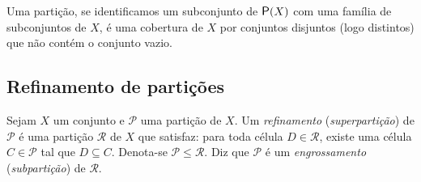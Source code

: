 Uma partição, se identificamos um subconjunto de $\p(X)$ com uma família de subconjuntos de $X$, é uma cobertura de $X$ por conjuntos disjuntos (logo distintos) que não contém o conjunto vazio.

\subsection{Refinamento de partições}

\begin{definition}
Sejam $X$ um conjunto e $\mathcal P$ uma partição de $X$. Um \emph{refinamento} (\emph{superpartição}) de $\mathcal P$ é uma partição $\mathcal R$ de $X$ que satisfaz: para toda célula $D \in \mathcal R$, existe uma célula $C \in \mathcal P$ tal que $D \subseteq C$. Denota-se $\mathcal P \leq \mathcal R$. Diz que $\mathcal P$ é um \emph{engrossamento} (\emph{subpartição}) de $\mathcal R$.
\end{definition}

